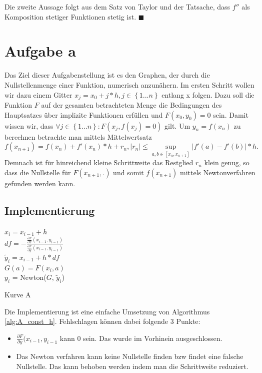 \documentclass[a4paper,11pt,bibliography=totoc,listof=totoc,headinclude=true,cleardoublepage=empty,oneside]{scrartcl}
\newcommand{\diff}[2]{\frac{\partial #1}{\partial #2}}
\newcounter{satz}
\begin{document}
Die zweite Aussage folgt aus dem Satz von Taylor und der Tatsache, dass $f''$ als Komposition stetiger Funktionen stetig ist. \hfill $\blacksquare$

\section{Aufgabe a}
Das Ziel dieser Aufgabenstellung ist es den Graphen, der durch die Nullstellenmenge einer Funktion, numerisch anzunähern. Im ersten Schritt wollen wir dazu einem Gitter $x_j = x_0 + j*h, j \in \left\lbrace1...n\right\rbrace $ entlang x folgen. 
Dazu soll die Funktion $F$ auf der gesamten betrachteten Menge die Bedingungen des Hauptsatzes über implizite Funktionen erfüllen und $F(x_0,y_0)=0$ sein. Damit wissen wir, dass $\forall j \in \left\lbrace1...n\right\rbrace: F(x_j,f(x_j)=0)$ gilt. Um $y_n = f(x_n)$ zu berechnen betrachte man mittels Mittelwertsatz
\[
f(x_{n+1})=f(x_n)+f'(x_n)*h+r_n, \left|r_n\right|\leq \sup\limits_{a,b \in \left[x_n,x_{n+1}\right]}\left|{f'(a)-f'(b)}\right|*h.
\]
Demnach ist für hinreichend kleine Schrittweite das Restglied $r_n$ klein genug, so dass die Nullstelle für $F(x_{n+1},.)$ und somit $f(x_{n+1})$ mittels Newtonverfahren gefunden werden kann.
\subsection{Implementierung}
\begin{algorithm}
	\label{alg:A_const_h}
	{
		$x_i = x_{i-1}+h$\\
		$df = -\frac{\diff{F}{x}(x_{i-1},y_{i-1})}{\diff{F}{y}(x_{i-1},y_{i-1})}$\\
		$\tilde y_i = x_{i-1}+h*df$\\
		$G(a) = F(x_i,a)$\\
		$y_i$ = Newton($G$, $\tilde y_i$)
	}
	\caption{Kurve A}
\end{algorithm}
Die Implementierung ist eine einfache Umsetzung von Algorithmus \ref{alg:A_const_h}.
Fehlschlagen können dabei folgende 3 Punkte:
\begin{itemize}
	\item $\diff{F}{y}(x_{i-1},y_{i-1}$ kann 0 sein. Das wurde im Vorhinein ausgeschlossen.
	\item Das Newton verfahren kann keine Nullstelle finden bzw findet eine falsche Nullstelle. Das kann behoben werden indem man die Schrittweite reduziert.
\end{itemize}
\end{document}
